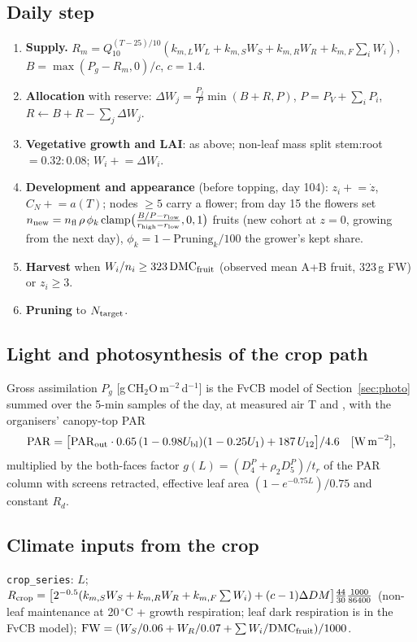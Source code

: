 \documentclass[11pt,a4paper]{article}
\newcommand{\code}[1]{\texttt{#1}}
\begin{document}
\subsection{Daily step}
\begin{enumerate}[nosep]
\item \textbf{Supply.} $R_m=Q_{10}^{(T-25)/10}(k_{m,L}W_L+k_{m,S}W_S+k_{m,R}W_R+k_{m,F}\sum_iW_i)$, $B=\max(P_g-R_m,0)/c$, $c=1.4$.
\item \textbf{Allocation} with reserve: $\Delta W_j=\frac{P_j}{P}\min(B+R,P)$, $P=P_V+\sum_iP_i$, $R\leftarrow B+R-\sum_j\Delta W_j$.
\item \textbf{Vegetative growth and LAI}: as above; non-leaf mass split stem:root $=0.32:0.08$; $W_i\mathrel{+}=\Delta W_i$.
\item \textbf{Development and appearance} (before topping, day 104): $z_i\mathrel{+}=\dot z$, $C_N\mathrel{+}=a(T)$; nodes $\ge5$ carry a
flower; from day 15 the flowers set $n_{\rm new}=n_{\rm fl}\,\rho\,\phi_k\,\mathrm{clamp}\bigl(\frac{B/P-r_{\rm low}}{r_{\rm high}-r_{\rm low}},0,1\bigr)$
fruits (new cohort at $z=0$, growing from the next day), $\phi_k=1-\text{Pruning}_k/100$ the grower's kept share.
\item \textbf{Harvest} when $W_i/n_i\ge323\,\mathrm{DMC}_{\rm fruit}$ (observed mean A+B fruit, 323\,g FW) or $z_i\ge3$.
\item \textbf{Pruning} to $N_{\rm target}$.
\end{enumerate}

\subsection{Light and photosynthesis of the crop path}
Gross assimilation $P_g$ [g\,CH$_2$O\,m$^{-2}$\,d$^{-1}$] is the FvCB model of Section~\ref{sec:photo} summed over the 5-min
samples of the day, at measured air T and , with the organisers' canopy-top PAR
\begin{equation}
\mathrm{PAR}=\bigl[\mathrm{PAR}_{\rm out}\cdot0.65\,(1-0.98U_{\rm bl})(1-0.25U_1)+187\,U_{12}\bigr]/4.6\quad[\text{W\,m}^{-2}],
\end{equation}
multiplied by the both-faces factor $g(L)=(D_4^P+\rho_2D_5^P)/t_r$ of the PAR column with screens retracted, effective leaf
area $(1-e^{-0.75L})/0.75$ and constant $R_d$.

\subsection{Climate inputs from the crop}
\code{crop\_series}: $L$; $R_{\rm crop}=\bigl[2^{-0.5}(k_{m,S}W_S+k_{m,R}W_R+k_{m,F}\sum W_i)+(c-1)\Delta DM\bigr]\frac{44}{30}\frac{1000}{86400}$
(non-leaf maintenance at 20\,$^\circ$C + growth respiration; leaf dark respiration is in the FvCB model);
$\mathrm{FW}=(W_S/0.06+W_R/0.07+\sum W_i/\mathrm{DMC}_{\rm fruit})/1000$.
\end{document}
